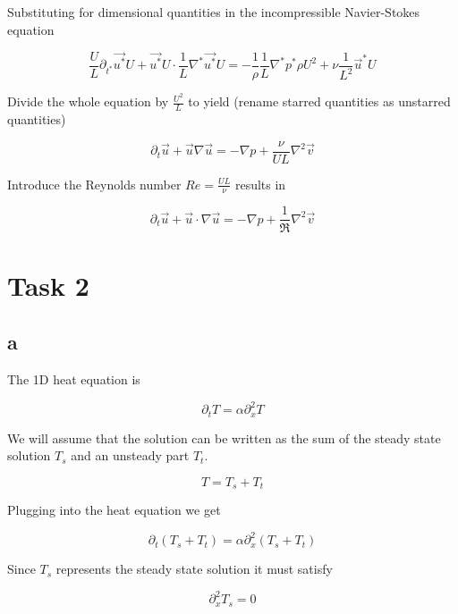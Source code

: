 \documentclass{article}
\begin{document}
Substituting for dimensional quantities in the incompressible Navier-Stokes equation

\begin{equation}
\frac{U}{L}\partial_{t^*} \vec{u^*} U + \vec{u^*} U \cdot \frac{1}{L}\nabla^* \vec{u^*} U = -\frac{1}{\rho} \frac{1}{L}\nabla^* p^* \rho U^2 + \nu \frac{1}{L^2}\vec{u}^*U
\end{equation}

Divide the whole equation by $\frac{U^2}{L}$ to yield (rename starred quantities as unstarred quantities)

\begin{equation}
\partial_t \vec{u} + \vec{u} \nabla \vec{u} = -\nabla p + \frac{\nu }{UL} \nabla^2 \vec{v}
\end{equation}

Introduce the Reynolds number $Re = \frac{UL}{\nu}$ results in

\begin{equation}
\partial_t \vec{u} + \vec{u}\cdot \nabla \vec{u}= -\nabla p + \frac{1}{\Re} \nabla^2 \vec{v}
\end{equation}

\section*{Task 2}

\subsection*{a}
The 1D heat equation is

\begin{equation}
\partial_t T = \alpha \partial_x^2 T
\end{equation}

We will assume that the solution can be written as the sum of the steady state solution $T_s$ and an unsteady part $T_t$.

\begin{equation}
T = T_s + T_t
\end{equation}

Plugging into the heat equation we get

\begin{equation}
\label{eq:heatparts}
\partial_t (T_s + T_t) = \alpha \partial_x^2 (T_s + T_t)
\end{equation}

Since $T_s$ represents the steady state solution it must satisfy

\begin{equation}
\label{eq:laplace}
\partial_x^2 T_s = 0
\end{equation}
\end{document}
